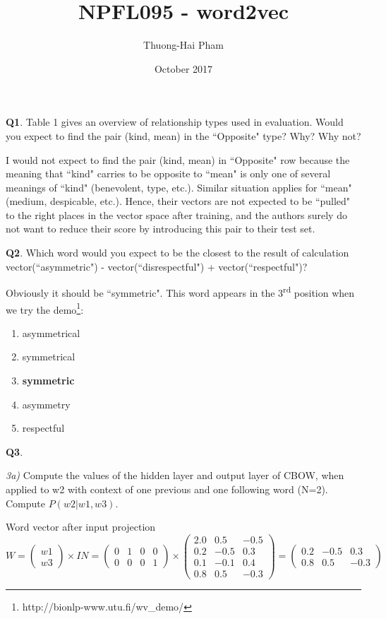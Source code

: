 \documentclass{article}
\title{NPFL095 - word2vec}
\author{Thuong-Hai Pham}
\date{October 2017}
\begin{document}
\maketitle

\textbf{Q1}. Table 1 gives an overview of relationship types used in evaluation.
Would you expect to find the pair (kind, mean) in the ``Opposite" type? Why? Why not?

I would not expect to find the pair (kind, mean) in ``Opposite" row because the meaning that ``kind" carries to be opposite to ``mean" is only one of several meanings of ``kind" (benevolent, type, etc.). Similar situation applies for ``mean" (medium, despicable, etc.). Hence, their vectors are not expected to be ``pulled" to the right places in the vector space after training, and the authors surely do not want to reduce their score by introducing this pair to their test set.


\textbf{Q2}. Which word would you expect to be the closest to the result of calculation vector(``asymmetric") - vector(``disrespectful") + vector(``respectful")?

Obviously it should be ``symmetric". This word appears in the 3\textsuperscript{rd} position when we try the demo\footnote{http://bionlp-www.utu.fi/wv\_demo/}:
\begin{enumerate}
    \item asymmetrical
    \item symmetrical
    \item \textbf{symmetric}
    \item asymmetry
    \item respectful
\end{enumerate}


\textbf{Q3}.

\textit{3a)} Compute the values of the hidden layer and output layer of CBOW, when applied to w2 with context of one previous and one following word (N=2).
Compute $P(w2|w1,w3)$.

Word vector after input projection
\[
W=
  \begin{pmatrix} w1\\ w3
  \end{pmatrix}
  \times IN
  =
  \begin{pmatrix}
    0 & 1 & 0 & 0 \\
    0 & 0 & 0 & 1
  \end{pmatrix}
  \times
  \begin{pmatrix}
    2.0 &  0.5 & -0.5\\
    0.2 & -0.5 & 0.3\\
    0.1 & -0.1 & 0.4\\
    0.8 & 0.5 & -0.3
  \end{pmatrix}
  =
  \begin{pmatrix}
    0.2 & -0.5 & 0.3\\
    0.8 & 0.5 & -0.3
  \end{pmatrix}
\]
\end{document}
